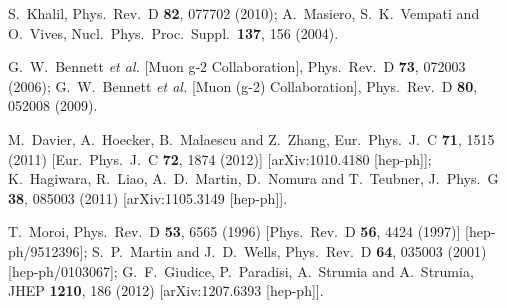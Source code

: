 \documentclass[12pt]{article}
\begin{document}
\begin{thebibliography}{99}
  S.~Khalil,
  Phys.\ Rev.\ D {\bf 82}, 077702 (2010);
  A.~Masiero, S.~K.~Vempati and O.~Vives,
  Nucl.\ Phys.\ Proc.\ Suppl.\  {\bf 137}, 156 (2004).

  G.~W.~Bennett {\it et al.} [Muon g-2 Collaboration],
  Phys.\ Rev.\ D {\bf 73}, 072003 (2006);
  G.~W.~Bennett {\it et al.} [Muon (g-2) Collaboration],
  Phys.\ Rev.\ D {\bf 80}, 052008 (2009).

  M.~Davier, A.~Hoecker, B.~Malaescu and Z.~Zhang,
  Eur.\ Phys.\ J.\ C {\bf 71}, 1515 (2011)
  [Eur.\ Phys.\ J.\ C {\bf 72}, 1874 (2012)]
  [arXiv:1010.4180 [hep-ph]];
  K.~Hagiwara, R.~Liao, A.~D.~Martin, D.~Nomura and T.~Teubner,
  J.\ Phys.\ G {\bf 38}, 085003 (2011)
  [arXiv:1105.3149 [hep-ph]].


  T.~Moroi,
  Phys.\ Rev.\ D {\bf 53}, 6565 (1996)
  [Phys.\ Rev.\ D {\bf 56}, 4424 (1997)]
  [hep-ph/9512396];
  S.~P.~Martin and J.~D.~Wells,
  Phys.\ Rev.\ D {\bf 64}, 035003 (2001)
  [hep-ph/0103067];
  G.~F.~Giudice, P.~Paradisi, A.~Strumia and A.~Strumia,
  JHEP {\bf 1210}, 186 (2012)
  [arXiv:1207.6393 [hep-ph]].


\end{thebibliography}
\end{document}
